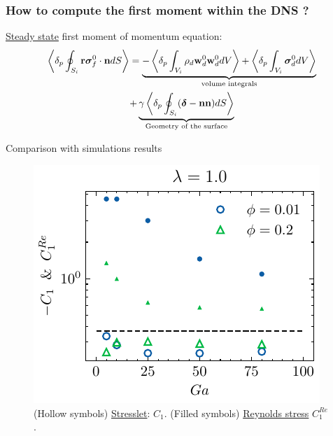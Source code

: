 \documentclass{sintefbeamer}
\begin{document}
\begin{frame}
  \frametitle{How to compute the first moment within the DNS ?}

  \underline{Steady state} first moment of momentum equation:
  \begin{multline*}
    \pSavg[i]{\textbf{r}\bm\sigma_f^0\cdot \textbf{n}}
    = 
    \underbrace{- \pOavg[i]{\rho_d \textbf{w}_d^0  \textbf{w}_d^0 }
    + \pOavg[i]{\bm\sigma_d^0}}_\text{volume integrals}\\
    +  \underbrace{\gamma \pSavg[i]{(\bm\delta - \textbf{nn})}}_\text{Geometry of the surface}
\end{multline*}

\end{frame}

\begin{frame}{Comparison with simulations results}
  \begin{figure}[h!]
    \centering
    \includegraphics[height = 0.25\textwidth]{image/HOMOGENEOUS_final/PA/Sdev_diapo_l_10.pdf}
    \caption{
      (Hollow symbols) \underline{Stresslet}: $C_1$. 
      (Filled symbols) \underline{Reynolds stress} $C_1^{Re}$. 
     }
\end{figure}



\end{frame}
\end{document}
